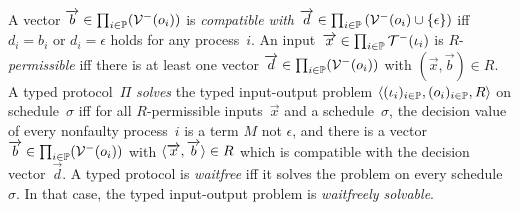 A vector $\overrightarrow b\in \prod_{i\in \mathbb{P}}(\mathcal{V}^-(o_i))$
is \textit{compatible with} $\overrightarrow d \in \prod_{i\in
\mathbb{P}}\left(\mathcal{V}^-(o_i)\cup\{\epsilon\}\right)$ iff
$d_i = b_i$ or $d_i = \epsilon$ holds for any process~$i$.
An input~$\overrightarrow x\in \prod_{i\in \mathbb{P}}\mathcal{T}^-(\iota_i)$
is \linebreak[2] $R$-\textit{permissible} iff there
is at least one
vector $\overrightarrow d\in \prod_{i\in \mathbb{P}}(\mathcal{V}^-(o_i))$ with $(\vec x, \vec b)\in R$.
A typed protocol~$\Pi$ \textit{solves} the typed input-output problem
  $\langle{(\iota_i)_{i\in \mathbb{P}}, (o_i)_{i\in \mathbb{P}}, R}\rangle$ on
schedule~$\sigma$ iff for all $R$-permissible inputs~$\vec x$ and a
schedule~$\sigma$,
 the decision value of every nonfaulty process~$i$ is a term
       $M$ not $\epsilon$, and
 there is a vector $\overrightarrow b\in \prod_{i\in \mathbb{P}}(\mathcal{V}^- (o_i))$
 with $\langle{\overrightarrow x, \overrightarrow b}\rangle \in R$ which is compatible with the
 decision vector~$\vec d$.
 A typed protocol is \textit{waitfree} iff it solves
 the problem on every schedule~$\sigma$.
 In that case, the typed input-output problem is
 \textit{waitfreely solvable}.

